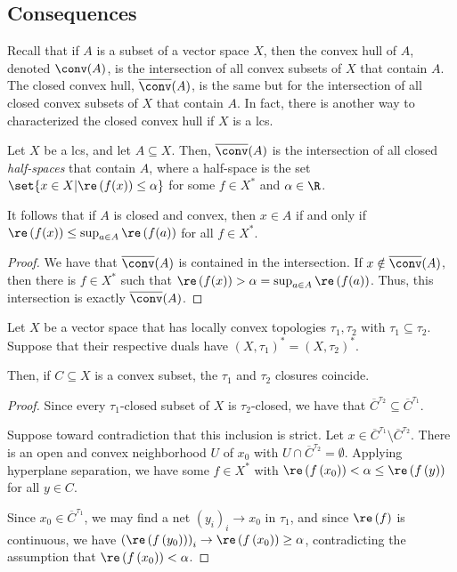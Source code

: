\documentclass[10pt]{mypackage}
\begin{document}
\subsection{Consequences}%
Recall that if $A$ is a subset of a vector space $X$, then the convex hull of $A$, denoted $\conv(A)$, is the intersection of all convex subsets of $X$ that contain $A$. The closed convex hull, $ \overline{\conv}(A) $, is the same but for the intersection of all closed convex subsets of $X$ that contain $A$. In fact, there is another way to characterized the closed convex hull if $X$ is a lcs.
\begin{proposition}
  Let $X$ be a lcs, and let $A\subseteq X$. Then, $ \overline{\conv}(A) $ is the intersection of all closed \textit{half-spaces} that contain $A$, where a half-space is the set $\set{x\in X | \re\left( f(x) \right) \leq \alpha}$ for some $f\in X^{\ast}$ and $\alpha\in \R$.

  It follows that if $A$ is closed and convex, then $x\in A$ if and only if $\re\left( f(x) \right) \leq \sup_{a\in A}\re\left( f(a) \right)$ for all $f\in X^{\ast}$.
\end{proposition}
\begin{proof}
  We have that $ \overline{\conv}(A) $ is contained in the intersection. If $x\notin \overline{\conv}(A)$, then there is $f\in X^{\ast}$ such that $\re\left( f(x) \right) > \alpha = \sup_{a\in A}\re\left( f(a) \right)$. Thus, this intersection is exactly $ \overline{\conv}(A) $.
\end{proof}
\begin{proposition}
  Let $X$ be a vector space that has locally convex topologies $\tau_1,\tau_2$ with $\tau_1\subseteq \tau_2$. Suppose that their respective duals have $\left( X,\tau_1 \right)^{\ast} = \left( X,\tau_2 \right)^{\ast}$.

  Then, if $C\subseteq X$ is a convex subset, the $\tau_1$ and $\tau_2$ closures coincide.
\end{proposition}
\begin{proof}
  Since every $\tau_1$-closed subset of $X$ is $\tau_2$-closed, we have that $ \overline{C}^{\tau_2}\subseteq \overline{C}^{\tau_1} $.

  Suppose toward contradiction that this inclusion is strict. Let $x\in \overline{C}^{\tau_1}\setminus \overline{C}^{\tau_2}$. There is an open and convex neighborhood $U$ of $x_0$ with $U\cap \overline{C}^{\tau_2} = \emptyset$. Applying hyperplane separation, we have some $f\in X^{\ast}$ with $\re\left( f\left( x_0 \right) \right) < \alpha \leq \re\left( f\left( y \right) \right)$ for all $y\in C$.

  Since $x_0\in \overline{C}^{\tau_1}$, we may find a net $\left( y_i \right)_i\rightarrow x_0$ in $\tau_1$, and since $\re\left( f \right)$ is continuous, we have $\left( \re\left( f\left( y_0 \right) \right) \right)_i\rightarrow \re\left( f\left( x_0 \right) \right)\geq \alpha$, contradicting the assumption that $\re\left( f\left( x_0 \right) \right) < \alpha$.
\end{proof}
\end{document}
